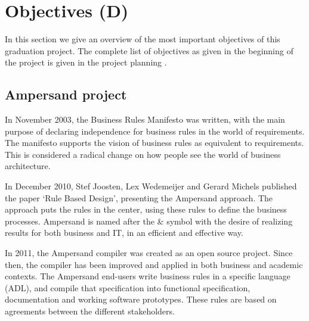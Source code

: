 
\section{Objectives (D)}
\label{sec:objectives}
In this section we give an overview of the most important objectives of this graduation project.
The complete list of objectives as given in the beginning of the project is given in the project planning .

\subsection{Ampersand project}
In November 2003, the Business Rules Manifesto \cite{business-rules} was written, with the main purpose of declaring independence for business rules in the world of requirements.
The manifesto supports the vision of business rules as equivalent to requirements.
This is considered a radical change on how people see the world of business architecture.

In December 2010, Stef Joosten, Lex Wedemeijer and Gerard Michels published the paper `Rule Based Design', presenting the Ampersand approach.
The approach puts the rules in the center, using these rules to define the business processes.
Ampersand is named after the \& symbol with the desire of realizing results for both business and IT, in an efficient and effective way.

In 2011, the Ampersand compiler was created as an open source project.
Since then, the compiler has been improved and applied in both business and academic contexts.
The Ampersand end-users write business rules in a specific language (ADL), and compile that specification into functional specification, documentation and working software prototypes.
%
These rules are based on agreements between the different stakeholders.

